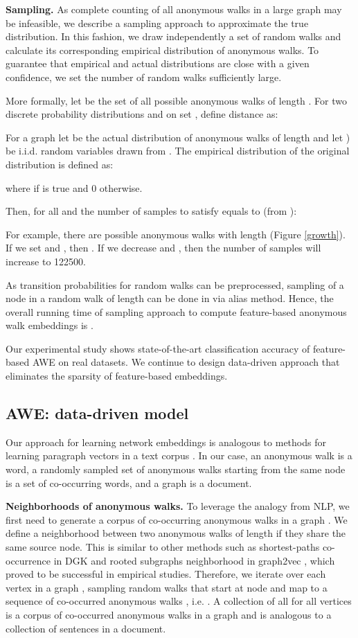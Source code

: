 \documentclass{article}
\theoremstyle{definition}
\begin{document}
\textbf{Sampling.} As complete counting of all anonymous walks in a large graph may be infeasible, we describe a sampling approach to approximate the true distribution. In this fashion, we draw independently a set of  random walks and calculate its corresponding empirical distribution of anonymous walks. To guarantee that empirical and actual distributions are close with a given confidence, we set the number  of random walks sufficiently large.

More formally, let  be the set of all possible anonymous walks of length . For two discrete probability distributions  and  on set , define  distance as:


For a graph  let  be the actual distribution of anonymous walks  of length  and let ) be i.i.d. random variables drawn from . The empirical distribution  of the original distribution  is defined as: 


where  if  is true and 0 otherwise.

Then, for all  and  the number of samples  to satisfy  equals to (from \cite{graphlet:09}):



For example, there are  possible anonymous walks with length  (Figure \ref{growth}). If we set  and , then . If we decrease  and , then the number of samples will increase to 122500. 

As transition probabilities for random walks can be preprocessed, sampling of a node in a random walk of length  can be done in  via alias method. Hence, the overall running time of sampling approach to compute feature-based anonymous walk embeddings is .

Our experimental study shows state-of-the-art classification accuracy of feature-based AWE on real datasets. We continue to design data-driven approach that eliminates the sparsity of feature-based embeddings.  

\subsection{AWE: data-driven model}
Our approach for learning network embeddings is analogous to methods for learning paragraph vectors in a text corpus \cite{doc2vec}. In our case, an anonymous walk is a word, a randomly sampled set of anonymous walks starting from the same node is a set of co-occurring words, and a graph is a document.

\textbf{Neighborhoods of anonymous walks.} To leverage the analogy from NLP, we first need to generate a corpus of co-occurring anonymous walks in a graph . We define a neighborhood between two anonymous walks of length  if they share the same source node. This is similar to other methods such as shortest-paths co-occurrence in DGK \cite{deepgraph} and rooted subgraphs neighborhood in graph2vec \cite{graph2vec:algo}, which proved to be successful in empirical studies. Therefore, we iterate over each vertex  in a graph , sampling  random walks  that start at node  and map to a sequence of co-occurred anonymous walks , i.e. . A collection of all  for all vertices  is a corpus of co-occurred anonymous walks in a graph and is analogous to a collection of sentences in a document. 
\end{document}
